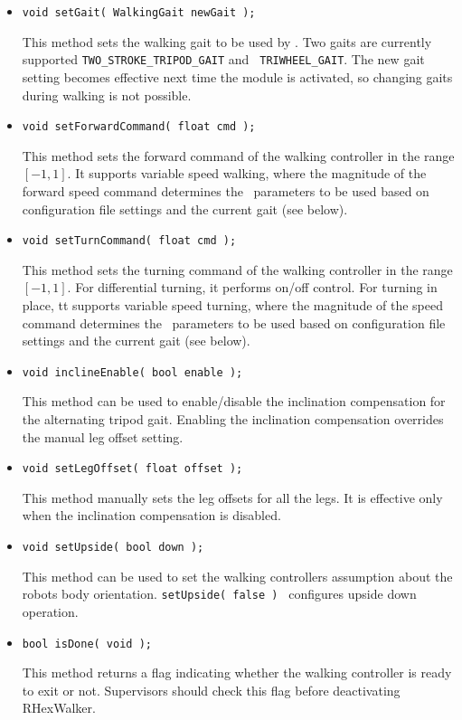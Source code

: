 \begin{itemize}
\item{\tt void setGait( WalkingGait newGait ); }\par
This method sets the walking gait to be used by \RHexWalker. Two gaits are
currently supported {\tt TWO\_STROKE\_TRIPOD\_GAIT} and {\tt
  TRIWHEEL\_GAIT}. The new gait setting becomes effective next time the
module is activated, so changing gaits during walking is not possible.

\item{\tt void setForwardCommand( float cmd ); }\par
This method sets the forward command of the walking controller in the range
$[-1, 1]$. It supports variable speed walking, where the magnitude of the
forward speed command determines the \WalkMachine\ parameters to be used
based on configuration file settings and the current gait (see below).

\item{\tt void setTurnCommand( float cmd ); }\par
This method sets the turning command of the walking controller in the range
$[-1, 1]$. For differential turning, it performs on/off control. For turning
in place, tt supports variable speed turning, where the magnitude of the
speed command determines the \WalkMachine\ parameters to be used
based on configuration file settings and the current gait (see below).

\item{\tt void inclineEnable( bool enable ); }\par
This method can be used to enable/disable the inclination compensation for
the alternating tripod gait. Enabling the inclination compensation overrides
the manual leg offset setting.

\item{\tt void setLegOffset( float offset ); }\par
This method manually sets the leg offsets for all the legs. It is effective
only when the inclination compensation is disabled.

\item{\tt void setUpside( bool down ); }\par
This method can be used to set the walking controllers assumption
about the robots body orientation. {\tt setUpside( false ) } configures
upside down operation.

\item{\tt bool isDone( void ); }\par
This method returns a flag indicating whether the walking controller is
ready to exit or not. Supervisors should check this flag before deactivating
RHexWalker.
\end{itemize}

